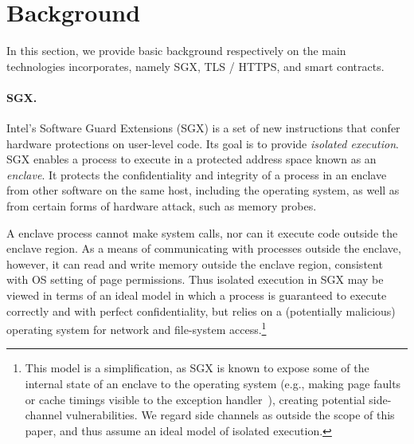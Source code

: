\section{Background}
\label{sec:background}

In this section, we provide basic background respectively on the main technologies \tc incorporates, namely SGX, TLS / HTTPS, and smart contracts.

\paragraph{\bf SGX.}
Intel's Software Guard Extensions (SGX) is a set of new instructions that confer hardware protections on user-level code. Its goal is to provide \emph{isolated execution}. SGX enables a process to execute in a protected address space known as an {\em enclave}. It protects the confidentiality and integrity of a process in an enclave from other software on the same host, including the operating system, as well as from certain forms of hardware attack, such as memory probes. 

A enclave process cannot make system calls, nor can it execute code outside the enclave region. As a means of communicating with processes outside the enclave, however, it can read and write memory outside the enclave region, consistent with OS setting of page permissions. Thus  isolated execution in SGX may be viewed in terms of an ideal model in which a process is guaranteed to execute correctly and with perfect confidentiality, but relies on a (potentially malicious) operating system for network and file-system access.\footnote{This model is a simplification, as SGX is known to expose some of the internal state of an enclave to the operating system (e.g., making page faults or cache timings visible to the exception handler~\cite{sgxexplained}), creating potential side-channel vulnerabilities. We regard side channels as outside the scope of this paper, and thus assume an ideal model of isolated execution.}

